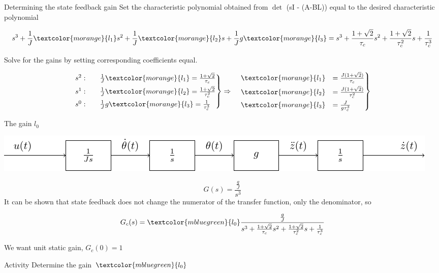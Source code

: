 \documentclass[presentation,aspectratio=169]{beamer}
\begin{document}
\begin{frame}[label={sec:org2393acf}]{Determining the state feedback gain}
Set the characteristic polynomial obtained from \(\det\) \Big(sI - (A-B\textcolor{morange}{L})\Big) equal to the desired characteristic polynomial

\[ s^3 + \frac{1}{J}\textcolor{morange}{l_1}s^2 + \frac{1}{J}\textcolor{morange}{l_2}s + \frac{1}{J}g\textcolor{morange}{l_3} =  s^3 + \frac{1 + \sqrt{2}}{\tau_c}s^2 + \frac{1+\sqrt{2}}{\tau_c^2}s + \frac{1}{\tau_c^3} \]

Solve for the gains by setting corresponding coefficients equal.

\begin{equation*}
\begin{rcases}
s^2: \quad & \frac{1}{J}\textcolor{morange}{l_1} = \frac{1 + \sqrt{2}}{\tau_c}\\
s^1: \quad & \frac{1}{J}\textcolor{morange}{l_2} = \frac{1 + \sqrt{2}}{\tau_c^2}\\
s^0: \quad & \frac{1}{J}g\textcolor{morange}{l_3} = \frac{1}{\tau_c^3}
\end{rcases} \Rightarrow
\begin{rcases}
 \quad \textcolor{morange}{l_1} &= \frac{J(1 + \sqrt{2})}{\tau_c}\\
 \quad \textcolor{morange}{l_2} &= \frac{J(1 + \sqrt{2})}{\tau_c^2}\\
 \quad \textcolor{morange}{l_3} &= \frac{J}{g\tau_c^3}
\end{rcases}
\end{equation*}
\end{frame}


\begin{frame}[label={sec:org8879e69}]{The gain \(l_0\)}
\begin{center}
\includegraphics[width=0.6\linewidth]{../../figures/block-apollo}
\end{center}

\[ G(s) = \frac{\frac{g}{J}}{s^3}\]
It can be shown that state feedback does not change the numerator of the transfer function, only the denominator, so

\[G_c(s) = \textcolor{mbluegreen}{l_0}\frac{\frac{g}{J}}{s^3 + \frac{1 + \sqrt{2}}{\tau_c}s^2 + \frac{1+\sqrt{2}}{\tau_c^2}s + \frac{1}{\tau_c^3}}\]

We want unit static gain,  \(G_c(0) = 1\)

\pause

\alert{Activity} Determine the gain \(\textcolor{mbluegreen}{l_0}\)
\end{frame}
\end{document}
